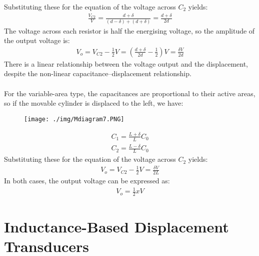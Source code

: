 Substituting these for the equation of the voltage across $C_2$ yields:
\begin{gather}
  \frac{V_{C2}}{V} = \frac{d+\delta}{(d-\delta)+(d+\delta)} = \frac{d+\delta}{2d}
\end{gather}
The voltage across each resistor is half the energising voltage, so the amplitude of the output voltage is:
\begin{gather}
  V_o = V_{C2}-\frac{1}{2}V = \left(\frac{d+\delta}{2d}-\frac{1}{2}\right)V = \frac{\delta V}{2d}
\end{gather}
There is a linear relationship between the voltage output and the displacement, despite the non-linear capacitance–displacement relationship. \\\\
For the variable-area type, the capacitances are proportional to their active areas, so if the movable cylinder is displaced to the left, we have:
\begin{figure}[H]
  \centering
  \texttt{[image: ./img/Mdiagram7.PNG]}
\end{figure}
\begin{gather}
  C_1 = \frac{L+\delta}{L}C_0 \\
  C_2 = \frac{L-\delta}{L}C_0
\end{gather}
Substituting these for the equation of the voltage across $C_2$ yields:
\begin{gather}
  V_o = V_{C2}-\frac{1}{2}V = \frac{\delta V}{2L}
\end{gather}
In both cases, the output voltage can be expressed as:
\begin{gather}
  V_o = \frac{1}{2}xV
\end{gather}
\section{Inductance-Based Displacement Transducers}

